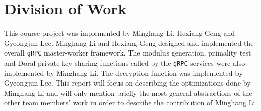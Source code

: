 \section{Division of Work }

This course project was implemented by Minghang Li, Hexiang Geng and Gyeongjun Lee. Minghang Li and Hexiang Geng designed and implemented the overall \texttt{gRPC} master-worker framework. The modulus generation, primality test and Doral private key sharing functions called by the \texttt{gRPC} services were also implemented by Minghang Li. The decryption function was implemented by Gyeongjun Lee. This report will focus on describing the optimizations done by Minghang Li and will only mention briefly the most general abstractions of the other team members' work in order to describe the contribution of Minghang Li.
